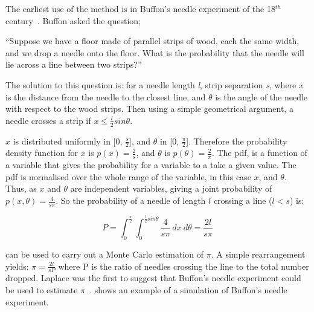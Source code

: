 The earliest use of the method is in Buffon's needle experiment of the 18$^{th}$ century~\cite{badger1994lazzarini,beckmann2015history,buffon1785histoire}. Buffon asked the question;

\medskip

``Suppose we have a floor made of parallel strips of wood, each the same width, and we drop a needle onto the floor. What is the probability that the needle will lie across a line between two strips?''

\medskip

The solution to this question is:
for a needle length \textit{l}, strip separation \textit{s}, where \textit{x} is the distance from the needle to the closest line, and $\theta$ is the angle of the needle with respect to the wood strips. Then using a simple geometrical argument, a needle crosses a strip if $x \leq \tfrac{l}{2} sin \theta$.

$x$ is distributed uniformly in [0, $\tfrac{s}{2}$], and $\theta$ in [0, $\tfrac{\pi}{2}$]. Therefore the probability density function for $x$ is $p(x)=\tfrac{2}{s}$, and $\theta$ is $p(\theta) = \tfrac{2}{\pi}$. The \gls*{pdf}, is a function of a variable that gives the probability for a variable to a take a given value. The \gls*{pdf} is normalised over the whole range of the variable, in this case $x$, and $\theta$.
Thus, as $x$ and $\theta$ are independent variables, giving a joint probability of $p(x,\theta) = \tfrac{4}{s \pi}$.
So the probability of a needle of length $l$ crossing a line ($l<s$) is:

\begin{equation}
P=\int_0^{\frac{\pi}{2}}\int_0^{\frac{l}{2}sin\theta}\frac{4}{s\pi}\ dx\ d\theta = \frac{2 l}{s \pi}\label{eqn:buffon}
\end{equation}


 can be used to carry out a Monte Carlo estimation of $\pi$. A simple rearrangement yields: $\pi = \tfrac{2l}{sP}$ where P is the ratio of needles crossing the line to the total number dropped. Laplace was the first to suggest that Buffon's needle experiment could be used to estimate $\pi$~\cite{beckmann2015history}. 
 shows an example of a simulation of Buffon's needle experiment.

